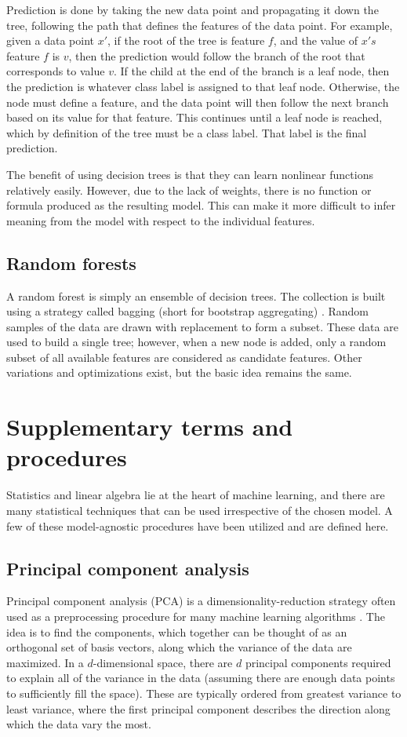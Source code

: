 Prediction is done by taking the new data point and propagating it down the tree, following the path that defines the features of the data point.  For example, given a data point $x'$, if the root of the tree is feature $f$, and the value of $x's$ feature $f$ is $v$, then the prediction would follow the branch of the root that corresponds to value $v$.  If the child at the end of the branch is a leaf node, then the prediction is whatever class label is assigned to that leaf node.  Otherwise, the node must define a feature, and the data point will then follow the next branch based on its value for that feature.  This continues until a leaf node is reached, which by definition of the tree must be a class label.  That label is the final prediction.

The benefit of using decision trees is that they can learn nonlinear functions relatively easily.  However, due to the lack of weights, there is no function or formula produced as the resulting model.  This can make it more difficult to infer meaning from the model with respect to the individual features.

\subsection{Random forests}
A random forest is simply an ensemble of decision trees.  The collection is built using a strategy called bagging (short for bootstrap aggregating) \cite{breiman2001}.  Random samples of the data are drawn with replacement to form a subset.  These data are used to build a single tree; however, when a new node is added, only a random subset of all available features are considered as candidate features.  Other variations and optimizations exist, but the basic idea remains the same.

\section{Supplementary terms and procedures}
Statistics and linear algebra lie at the heart of machine learning, and there are many statistical techniques that can be used irrespective of the chosen model.  A few of these model-agnostic procedures have been utilized and are defined here.

\subsection{Principal component analysis}
Principal component analysis (PCA) is a dimensionality-reduction strategy often used as a preprocessing procedure for many machine learning algorithms \cite{tharwat2016}.  The idea is to find the components, which together can be thought of as an orthogonal set of basis vectors, along which the variance of the data are maximized.  In a $d$-dimensional space, there are $d$ principal components required to explain all of the variance in the data (assuming there are enough data points to sufficiently fill the space).  These are typically ordered from greatest variance to least variance, where the first principal component describes the direction along which the data vary the most.

